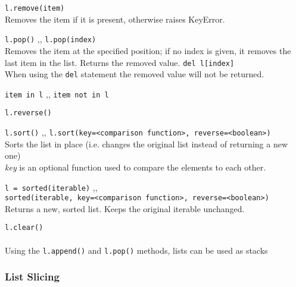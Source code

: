 \begin{itemize}
       \texttt{l.remove(item)} \\
      Removes the item if it is present, otherwise raises KeyError.

      \begin{itemize}
           \texttt{l.pop()} \sep{,}
          \texttt{l.pop(index)} \\
          Removes the item at the specified position; if no index is given, it removes the last item
          in the list. Returns the removed value.
           \texttt{del l[index]} \\
          When using the \texttt{del} statement the removed value will not be returned.
      \end{itemize}
      

       \texttt{item in l} \sep{,}
      \texttt{item not in l}

       \texttt{l.reverse()}

       \texttt{l.sort()} \sep{,}
      \texttt{l.sort(key=<comparison function>, reverse=<boolean>)} \\
      Sorts the list in place (i.e. changes the original list instead of returning a new one)\\
      \textit{key} is an optional function used to compare the elements to each other.

       \texttt{l = sorted(iterable)} \sep{,} \\
      \texttt{sorted(iterable, key=<comparison function>, reverse=<boolean>)} \\
      Returns a new, sorted list. Keeps the original iterable unchanged. 

       \texttt{l.clear()}
      \\ \\
      Using the \texttt{l.append()} and \texttt{l.pop()} methods, lists
      can be used as stacks

    \end{itemize}

    \subsubsection{List Slicing} \label{List Slicing}

